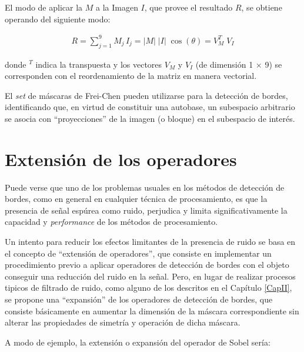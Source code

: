El modo de aplicar la $M$ a la Imagen $I$, que provee el resultado $R$, se obtiene operando del siguiente modo:

\begin{eqnarray}
	R = \sum _{j=1} ^{9} M_{j} \, I_{j} = \lvert M \rvert \; \lvert I \rvert \; \cos(\theta) = V_{M}^{T} \; V_{I} 
\label{EqAAF}
\end{eqnarray}

donde $^{T}$ indica la transpuesta y los vectores $V_{M}$ y $V_{I}$ (de dimensi\'on 1 $\times$ 9) se corresponden con el reordenamiento de 
la matriz en manera vectorial.
%

El \textit{set} de m\'ascaras de Frei-Chen pueden utilizarse para la detecci\'on de bordes, identificando que, en virtud de constituir 
una autobase, un subespacio arbitrario se asocia con ``proyecciones'' de la imagen (o bloque) en el subespacio de inter\'es.



\section{Extensi\'on de los operadores}
\label{CapV_7}


Puede verse que uno de los problemas usuales en los m\'etodos de detecci\'on de bordes, como en general en cualquier t\'ecnica de 
procesamiento, es que la presencia de se\~nal esp\'urea como ruido, perjudica y limita significativamente la capacidad y 
\textit{performance} de los m\'etodos de procesamiento.
%

Un intento para reducir los efectos limitantes de la presencia de ruido se basa en el concepto de ``extensi\'on de operadores'', que 
consiste en implementar un procedimiento previo a aplicar operadores de detecci\'on de bordes con el objeto conseguir una reducci\'on 
del ruido en la se\~nal.
%
Pero, en lugar de realizar procesos t\;ipicos de filtrado de ruido, como alguno de los descritos en el Cap\'itulo \ref{CapII}, se propone
una ``expansi\'on'' de los operadores de detecci\'on de bordes, que consiste b\'asicamente en aumentar la dimensi\'on de la m\'ascara 
correspondiente sin alterar las propiedades de simetr\'ia y operaci\'on de dicha m\'ascara.
%

A modo de ejemplo, la extensi\'on o expansi\'on del operador de Sobel ser\'ia:

